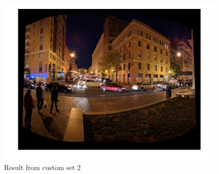 \documentclass[12pt]{article}
\begin{document}
\begin{figure}[t!]
    \centering
    \includegraphics[width=\linewidth]{img/set_c2_pan1}
    \caption{Result from custom set 2}
    \label{fig_result_c2}
\end{figure}
\end{document}
